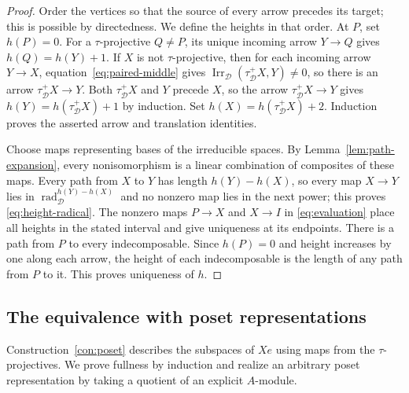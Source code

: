 \documentclass[a4paper,reqno,10pt]{amsart}
\theoremstyle{definition}
\numberwithin{equation}{section}
\DeclareMathOperator{\Irr}{Irr}
\DeclareMathOperator{\rad}{rad}
\newcommand{\cD}{\mathcal D}
\begin{document}
\begin{proof}
Order the vertices so that the source of every arrow precedes its target;
this is possible by directedness. We define the heights in that order. At \(P\),
set \(h(P)=0\).
For a \(\tau\)-projective \(Q\ne P\), its unique incoming arrow
\(Y\to Q\) gives \(h(Q)=h(Y)+1\).
If \(X\) is not \(\tau\)-projective, then for each incoming arrow
\(Y\to X\), equation~\eqref{eq:paired-middle} gives
\(\Irr_{\cD}(\tau_{\cD}^+X,Y)\ne0\), so there is an arrow \(\tau_{\cD}^+X\to Y\).
Both \(\tau_{\cD}^+X\) and \(Y\) precede \(X\), so the arrow
\(\tau_{\cD}^+X\to Y\) gives \(h(Y)=h(\tau_{\cD}^+X)+1\) by induction. Set \(h(X)=h(\tau_{\cD}^+X)+2\). Induction proves the asserted arrow
and translation identities.

Choose maps representing bases of the irreducible spaces. By Lemma~\ref{lem:path-expansion}, every nonisomorphism is a linear
combination of composites of these maps. Every path from \(X\)
to \(Y\) has length \(h(Y)-h(X)\), so every map \(X\to Y\) lies in
\(\rad_{\cD}^{h(Y)-h(X)}\) and no nonzero map lies in the next power; this
proves \eqref{eq:height-radical}. The nonzero maps \(P\to X\) and \(X\to I\)
in \eqref{eq:evaluation} place all heights in the stated interval and give
uniqueness at its endpoints.
There is a path from \(P\) to every indecomposable. Since \(h(P)=0\)
and height increases by one along each arrow, the height of each
indecomposable is the length of any path from \(P\) to it. This proves
uniqueness of \(h\).
\end{proof}

\subsection{The equivalence with poset representations}\label{app:poset}
Construction~\ref{con:poset} describes the subspaces of \(Xe\) using
maps from the \(\tau\)-projectives. We prove fullness by induction and
realize an arbitrary poset representation by taking a quotient of an
explicit \(A\)-module.
\end{document}
